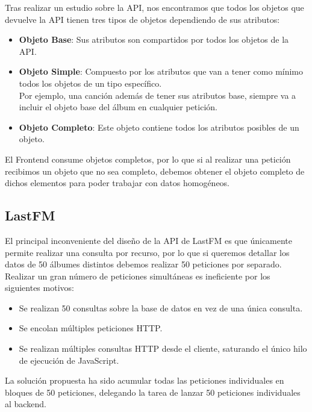 Tras realizar un estudio sobre la API, nos encontramos que todos los
objetos que devuelve la API tienen tres tipos de objetos dependiendo de
sus atributos:

\begin{itemize}
\itemsep0em 
\item
  \textbf{Objeto Base}: Sus atributos son compartidos por todos los objetos de la
  API.
\item
  \textbf{Objeto Simple}: Compuesto por los atributos que van a tener como mínimo
  todos los objetos de un tipo específico.\\
  Por ejemplo, una canción además de tener sus atributos base, siempre
  va a incluir el objeto base del álbum en cualquier petición.
\item
  \textbf{Objeto Completo}: Este objeto contiene todos los atributos posibles de
  un objeto.
\end{itemize}

El Frontend consume objetos completos, por lo que si al realizar una
petición recibimos un objeto que no sea completo, debemos obtener el
objeto completo de dichos elementos para poder trabajar con datos
homogéneos.

\hypertarget{lastfm}{%
\subsection{LastFM}\label{lastfm}}

El principal inconveniente del diseño de la API de LastFM es que
únicamente permite realizar una consulta por recurso, por lo que si
queremos detallar los datos de 50 álbumes distintos debemos realizar 50
peticiones por separado.\\
Realizar un gran número de peticiones simultáneas es ineficiente por los siguientes motivos:

\begin{itemize}
\itemsep0em
\item
  Se realizan 50 consultas sobre la base de datos en vez de una única
  consulta.
\item
  Se encolan múltiples peticiones HTTP.
\item
  Se realizan múltiples consultas HTTP desde el cliente, saturando el
  único hilo de ejecución de JavaScript.
\end{itemize}

La solución propuesta ha sido acumular todas las peticiones individuales
en bloques de 50 peticiones, delegando la tarea de lanzar 50 peticiones
individuales al backend.

